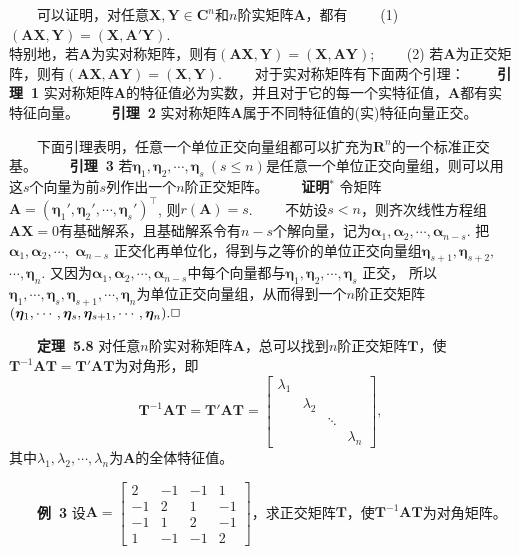 \documentclass[compress,mathserif,cjk]{beamer}
\theoremstyle{remark}
\numberwithin{equation}{section}
\newcommand{\hei}{\bf}      %
\begin{document}
\begin{CJK}{UTF8}{gbsn}
\begin{frame}
\ \ \ \ 可以证明，对任意$\bm X,\bm Y\in\mathbf C^n$和$n$阶实矩阵$\bm A$，都有
\vskip 5pt
\ \ \ \  (1) $(\bm{AX},\bm Y)=(\bm X,\bm A'\bm Y)$.\\ 特别地，若$\bm A$为实对称矩阵，则有$(\bm{AX},\bm Y)=(\bm X,\bm A\bm Y)$;
\vskip 5pt
\ \ \ \  (2) 若$\bm A$为正交矩阵，则有$(\bm{AX},\bm{AY})=(\bm X,\bm Y)$.
\pause\vskip 10pt
\ \ \ \ 对于实对称矩阵有下面两个引理：
\vskip 5pt
\ \ \ \ {\hei 引理~1} 实对称矩阵$\bm A$的特征值必为实数，并且对于它的每一个实特征值，$\bm A$都有实特征向量。
\pause\vskip 5pt
\ \ \ \ {\hei 引理~2} 实对称矩阵$\bm A$属于不同特征值的(实)特征向量正交。
\end{frame}
\begin{frame}
\ \ \ \ 下面引理表明，任意一个单位正交向量组都可以扩充为$\mathbf R^n$的一个标准正交基。
\vskip 5pt
\ \ \ \ {\hei 引理~3} 若$\bm\eta_1,\bm\eta_2,\cdots,\bm\eta_s~(s\leq n)$是任意一个单位正交向量组，则可以用这$s$个向量为前$s$列作出一个$n$阶正交矩阵。
\pause\vskip 5pt
\ \ \ \ {\hei 证明$^*$} 令矩阵$\bm A=(\bm\eta_1',\bm\eta_2',\cdots,\bm\eta_s')^\top$, 则$r(\bm A)=s$.
 \vskip 5pt
\ \ \ \ 不妨设$s<n$，则齐次线性方程组$\bm A\bm X=0$有基础解系，且基础解系令有$n-s$个解向量，记为$\bm\alpha_1,\bm\alpha_2,\cdots,\bm\alpha_{n-s}$. 把$\bm\alpha_1,\bm\alpha_2,\cdots,$ $\bm\alpha_{n-s}$ 正交化再单位化，得到与之等价的单位正交向量组$\bm\eta_{s+1},\bm\eta_{s+2},$ $\cdots,\bm\eta_n$. 又因为$\bm\alpha_1,\bm\alpha_2,\cdots,\bm\alpha_{n-s}$中每个向量都与$\bm\eta_1,\bm\eta_2,\cdots,\bm\eta_s$ 正交，
所以$\bm\eta_1,\cdots,\bm\eta_s,\bm\eta_{s+1},\cdots,\bm\eta_n$为单位正交向量组，从而得到一个$n$阶正交矩阵$(\bm\eta_1,\cdots,\bm\eta_s,\bm\eta_{s+1},\cdots,\bm\eta_n).\hfill\Box$
\end{frame}
\begin{frame}
\ \ \ \ {\hei 定理~5.8} 对任意$n$阶实对称矩阵$\bm A$，总可以找到$n$阶正交矩阵$\bm T$，使$\bm T^{-1}\bm{AT}=\bm T'\bm{AT}$为对角形，即
$$\bm T^{-1}\bm{AT}=\bm T'\bm{AT}=\left[\begin{matrix}\lambda_1&&&\\&\lambda_2&&\\&&\ddots&\\&&&\lambda_n\end{matrix}\right],$$
其中$\lambda_1,\lambda_2,\cdots,\lambda_n$为$\bm A$的全体特征值。
\end{frame}
\begin{frame}
\ \ \ \ {\hei 例~3} 设$\bm A=\left[\begin{matrix}2&-1&-1&1\\-1&2&1&-1\\-1&1&2&-1\\1&-1&-1&2\end{matrix}\right]$，求正交矩阵$\bm T$，使$\bm T^{-1}\bm{AT}$为对角矩阵。

\end{frame}
\end{CJK}
\end{document}

